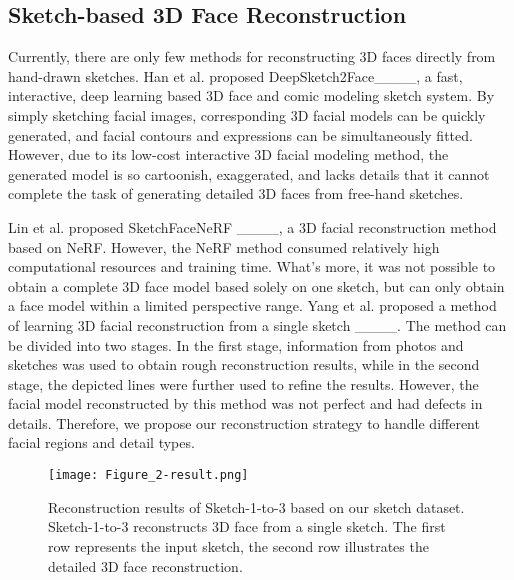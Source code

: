 \subsection{Sketch-based 3D Face Reconstruction} 
Currently, there are only few methods for reconstructing 3D faces directly from hand-drawn sketches. 
Han et al. proposed DeepSketch2Face____, a fast, interactive, deep learning based 3D face and comic modeling sketch system. By simply sketching facial images, corresponding 3D facial models can be quickly generated, and facial contours and expressions can be simultaneously fitted. However, due to its low-cost interactive 3D facial modeling method, the generated model is so cartoonish, exaggerated, and lacks details that it cannot complete the task of generating detailed 3D faces from free-hand sketches.

Lin et al. proposed SketchFaceNeRF ____, a 3D facial reconstruction method based on NeRF. However, the NeRF method consumed relatively high computational resources and training time. What’s more, it was not possible to obtain a complete 3D face model based solely on one sketch, but can only obtain a face model within a limited perspective range. Yang et al. proposed a method of learning 3D facial reconstruction from a single sketch ____. The method can be divided into two stages. In the first stage, information from photos and sketches was used to obtain rough reconstruction results, while in the second stage, the depicted lines were further used to refine the results. However, the facial model reconstructed by this method was not perfect and had defects in details. Therefore, we propose our reconstruction strategy to handle different facial regions and detail types.




\begin{figure*}[t]
    \centering
    \texttt{[image: Figure\_2-result.png]}
    \caption{Reconstruction results of Sketch-1-to-3 based on our sketch dataset. Sketch-1-to-3 reconstructs 3D face from a single sketch. The first row represents the input sketch, the second row illustrates the detailed 3D face reconstruction.}
   \label{fig:first}
\end{figure*}

